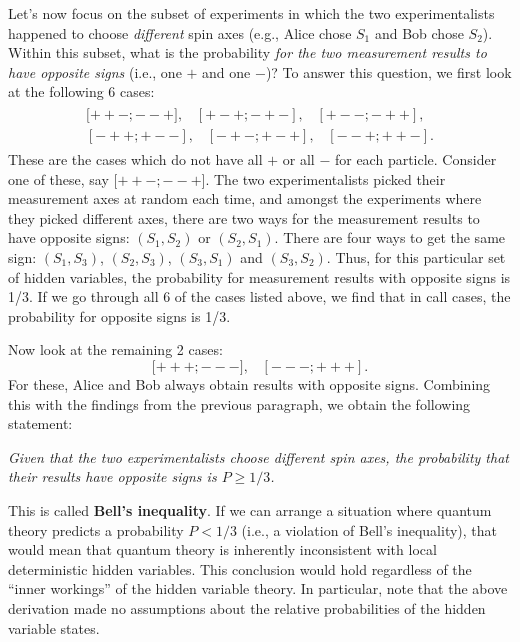 \documentclass[pra,12pt]{revtex4}
\begin{document}
Let's now focus on the subset of experiments in which the two
experimentalists happened to choose \textit{different} spin axes
(e.g., Alice chose $S_1$ and Bob chose $S_2$).  Within this subset,
what is the probability \textit{for the two measurement results to
  have opposite signs} (i.e., one $+$ and one $-$)?  To answer this
question, we first look at the following 6 cases:
\begin{align*}
  \begin{aligned}{[}{++-};{--+}], \;\;\; [{+-+};{-+-}], \;\;\; [{+--};{-++}],\\ [{-++};{+--}], \;\;\; [{-+-};{+-+}], \;\;\; [{--+};{++-}].\end{aligned}
\end{align*}
These are the cases which do not have all $+$ or all $-$ for each
particle.  Consider one of these, say ${[}{++-};{--+}]$.  The two
experimentalists picked their measurement axes at random each time,
and amongst the experiments where they picked different axes, there
are two ways for the measurement results to have opposite signs:
$(S_1,S_2)$ or $(S_2,S_1)$.  There are four ways to get the same sign:
$(S_1,S_3)$, $(S_2,S_3)$, $(S_3,S_1)$ and $(S_3, S_2)$.  Thus,
for this particular set of hidden variables, the probability for
measurement results with opposite signs is 1/3.  If we go through all
6 of the cases listed above, we find that in call cases, the
probability for opposite signs is 1/3.

Now look at the remaining 2 cases:
\begin{equation*}
  {[}{+++};{---}], \;\;\; [{---};{+++}].
\end{equation*}
For these, Alice and Bob always obtain results with opposite signs.
Combining this with the findings from the previous paragraph, we
obtain the following statement:

\textit{Given that the two experimentalists choose different spin
  axes, the probability that their results have opposite signs is $P
  \ge 1/3$.}

This is called \textbf{Bell's inequality}.  If we can arrange a
situation where quantum theory predicts a probability $P < 1/3$ (i.e.,
a violation of Bell's inequality), that would mean that quantum theory
is inherently inconsistent with local deterministic hidden variables.
This conclusion would hold regardless of the ``inner workings'' of the
hidden variable theory.  In particular, note that the above derivation
made no assumptions about the relative probabilities of the hidden
variable states.
\end{document}
